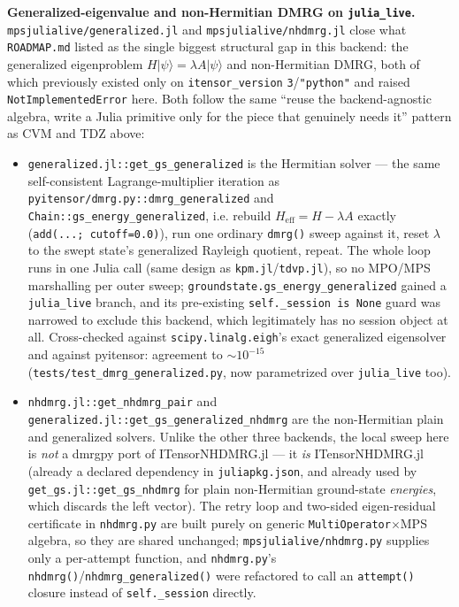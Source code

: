 \documentclass[11pt]{article}
\begin{document}
\textbf{Generalized-eigenvalue and non-Hermitian DMRG on
\lstinline|julia_live|.} \texttt{mpsjulialive/generalized.jl} and
\texttt{mpsjulialive/nhdmrg.jl} close what \texttt{ROADMAP.md} listed as
the single biggest structural gap in this backend: the generalized
eigenproblem $H|\psi\rangle=\lambda A|\psi\rangle$ and non-Hermitian
DMRG, both of which previously existed only on \lstinline|itensor_version|
\lstinline|3|/\lstinline|"python"| and raised
\lstinline|NotImplementedError| here. Both follow the same ``reuse the
backend-agnostic algebra, write a Julia primitive only for the piece that
genuinely needs it'' pattern as CVM and TDZ above:

\begin{itemize}
\item \lstinline|generalized.jl::get_gs_generalized| is the Hermitian
  solver --- the same self-consistent Lagrange-multiplier iteration as
  \lstinline|pyitensor/dmrg.py::dmrg_generalized| and
  \lstinline|Chain::gs_energy_generalized|, i.e. rebuild
  $H_\mathrm{eff}=H-\lambda A$ exactly (\lstinline|add(...; cutoff=0.0)|),
  run one ordinary \lstinline|dmrg()| sweep against it, reset $\lambda$ to
  the swept state's generalized Rayleigh quotient, repeat. The whole loop
  runs in one Julia call (same design as \texttt{kpm.jl}/\texttt{tdvp.jl}),
  so no MPO/MPS marshalling per outer sweep;
  \lstinline|groundstate.gs_energy_generalized| gained a
  \lstinline|julia_live| branch, and its pre-existing
  \lstinline|self._session is None| guard was narrowed to exclude this
  backend, which legitimately has no session object at all. Cross-checked
  against \lstinline|scipy.linalg.eigh|'s exact generalized eigensolver
  and against pyitensor: agreement to $\sim10^{-15}$
  (\texttt{tests/test\_dmrg\_generalized.py}, now parametrized over
  \lstinline|julia_live| too).
\item \lstinline|nhdmrg.jl::get_nhdmrg_pair| and
  \lstinline|generalized.jl::get_gs_generalized_nhdmrg| are the
  non-Hermitian plain and generalized solvers. Unlike the other three
  backends, the local sweep here is \emph{not} a dmrgpy port of
  ITensorNHDMRG.jl --- it \emph{is} ITensorNHDMRG.jl (already a declared
  dependency in \texttt{juliapkg.json}, and already used by
  \lstinline|get_gs.jl::get_gs_nhdmrg| for plain non-Hermitian
  ground-state \emph{energies}, which discards the left vector). The
  retry loop and two-sided eigen-residual certificate in
  \texttt{nhdmrg.py} are built purely on generic
  \lstinline|MultiOperator|$\times$MPS algebra, so they are shared
  unchanged; \texttt{mpsjulialive/nhdmrg.py} supplies only a per-attempt
  function, and \texttt{nhdmrg.py}'s
  \lstinline|nhdmrg()|/\lstinline|nhdmrg_generalized()| were refactored to
  call an \lstinline|attempt()| closure instead of \lstinline|self._session|
  directly.
\end{itemize}
\end{document}
